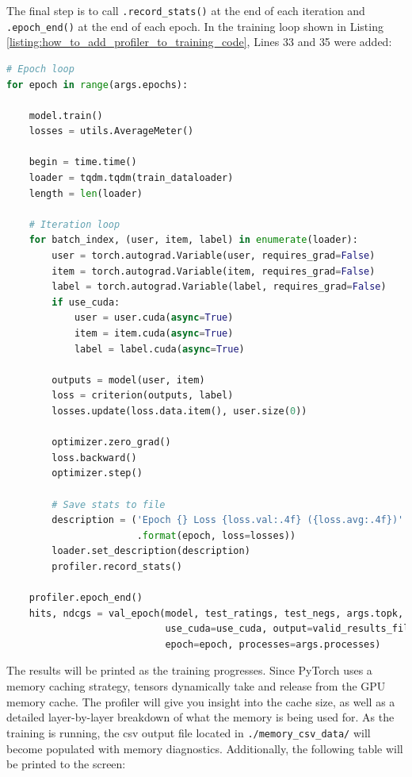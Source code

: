 \documentclass[12pt,letterpaper]{article}
\begin{document}
The final step is to call \texttt{.record\_stats()} at the end of each iteration and \texttt{.epoch\_end()} at the end of each epoch. In the training loop shown in Listing \ref{listing:how_to_add_profiler_to_training_code}, Lines 33 and 35 were added:
\begin{lstlisting}[language=Python, caption={Example NCF training code with lines 33 and 35 added to enable memory profiling}, label={listing:how_to_add_profiler_to_training_code}]
# Epoch loop
for epoch in range(args.epochs):

    model.train()
    losses = utils.AverageMeter()

    begin = time.time()
    loader = tqdm.tqdm(train_dataloader)
    length = len(loader)
    
    # Iteration loop
    for batch_index, (user, item, label) in enumerate(loader):
        user = torch.autograd.Variable(user, requires_grad=False)
        item = torch.autograd.Variable(item, requires_grad=False)
        label = torch.autograd.Variable(label, requires_grad=False)
        if use_cuda:
            user = user.cuda(async=True)
            item = item.cuda(async=True)
            label = label.cuda(async=True)

        outputs = model(user, item)
        loss = criterion(outputs, label)
        losses.update(loss.data.item(), user.size(0))

        optimizer.zero_grad()
        loss.backward()
        optimizer.step()

        # Save stats to file
        description = ('Epoch {} Loss {loss.val:.4f} ({loss.avg:.4f})'
                       .format(epoch, loss=losses))
        loader.set_description(description)
        profiler.record_stats()

    profiler.epoch_end()
    hits, ndcgs = val_epoch(model, test_ratings, test_negs, args.topk,
                            use_cuda=use_cuda, output=valid_results_file,
                            epoch=epoch, processes=args.processes)
\end{lstlisting}
The results will be printed as the training progresses. Since PyTorch uses a memory caching strategy, tensors dynamically take and release from the GPU memory cache. The profiler will give you insight into the cache size, as well as a detailed layer-by-layer breakdown of what the memory is being used for. As the training is running, the csv output file located in \texttt{./memory\_csv\_data/} will become populated with memory diagnostics. Additionally, the following table will be printed to the screen:
\end{document}
